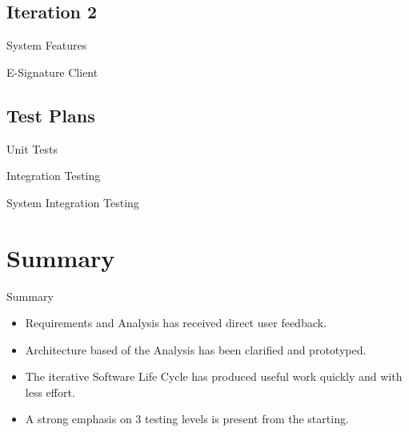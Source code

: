 \documentclass{beamer}
\begin{document}
\subsection{Iteration 2}
\begin{frame}{System Features}
\end{frame}
\begin{frame}{E-Signature Client}
\end{frame}

\subsection{Test Plans}
\begin{frame}{Unit Tests}
\end{frame}
\begin{frame}{Integration Testing}
\end{frame}
\begin{frame}{System Integration Testing}
\end{frame}





\section*{Summary}

\begin{frame}{Summary}

\begin{itemize}
\item
Requirements and Analysis has received direct user feedback.
\item
Architecture based of the Analysis has been clarified and prototyped. 
\item 
The iterative Software Life Cycle has produced useful work quickly and with less effort.
\item
A strong emphasis on 3 testing levels is present from the starting.
\end{itemize}
\end{frame}
\end{document}
